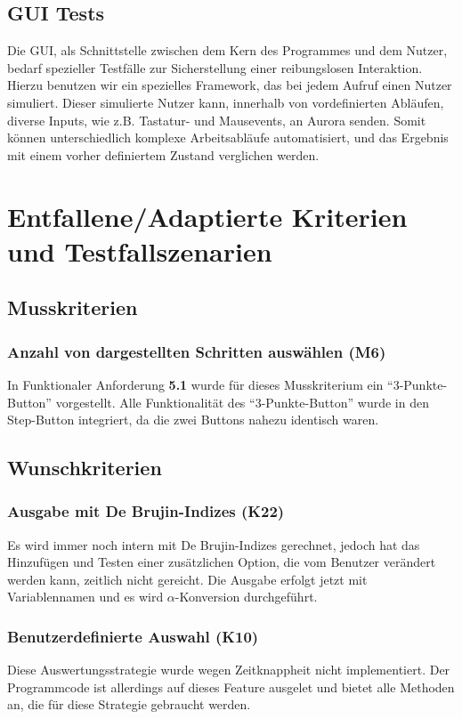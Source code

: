 \documentclass[parskip=full,11pt,twoside]{scrartcl}
\begin{document}
\subsection{GUI Tests}
Die GUI, als Schnittstelle zwischen dem Kern des Programmes und dem Nutzer, bedarf spezieller Testfälle zur Sicherstellung einer reibungslosen Interaktion.
Hierzu benutzen wir ein spezielles Framework, das bei jedem Aufruf einen Nutzer simuliert.
Dieser simulierte Nutzer kann, innerhalb von vordefinierten Abläufen, diverse Inputs, wie z.B. Tastatur- und Mausevents, an Aurora senden.
Somit können unterschiedlich komplexe Arbeitsabläufe automatisiert, und das Ergebnis mit einem vorher definiertem Zustand verglichen werden.



\section{Entfallene/Adaptierte Kriterien und Testfallszenarien}
\subsection{Musskriterien}

\subsubsection{Anzahl von dargestellten Schritten auswählen (M6)}
In Funktionaler Anforderung \textbf{5.1} wurde für dieses Musskriterium ein \enquote{3-Punkte-Button}
vorgestellt.
Alle Funktionalität des \enquote{3-Punkte-Button} wurde in den Step-Button integriert, da die zwei Buttons nahezu identisch waren. 

\subsection{Wunschkriterien}

\subsubsection{Ausgabe mit De Brujin-Indizes (K22)}
Es wird immer noch intern mit De Brujin-Indizes gerechnet, jedoch hat das Hinzufügen und Testen einer zusätzlichen Option,
die vom Benutzer verändert werden kann, zeitlich nicht gereicht.
Die Ausgabe erfolgt jetzt mit Variablennamen und es wird $\alpha$-Konversion durchgeführt.

\subsubsection{Benutzerdefinierte Auswahl (K10)}
Diese Auswertungsstrategie wurde wegen Zeitknappheit nicht implementiert.
Der Programmcode ist allerdings auf dieses Feature ausgelet und bietet
alle Methoden an, die für diese Strategie gebraucht werden.
\end{document}
